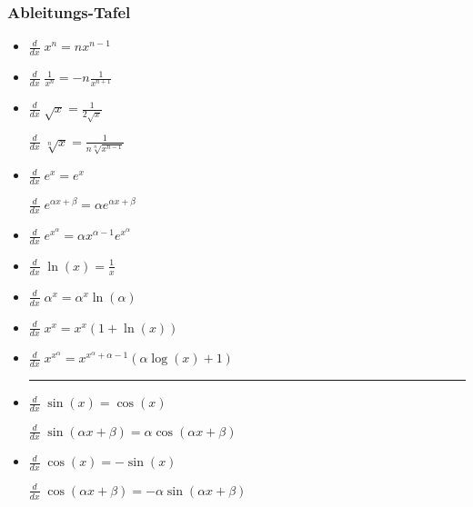 \subsubsection{Ableitungs-Tafel}
\begin{itemize}[leftmargin=*]
	\item $\frac{d}{dx}\; x^n = nx^{n-1}$
	\item $\frac{d}{dx}\; \frac{1}{x^n} = -n \frac{1}{x^{n+1}}$
	
	\item 
	\begin{minipage}{0.4\columnwidth}
		$\frac{d}{dx}\; \sqrt{x} = \frac{1}{2\sqrt{x}}$
	\end{minipage}
	\begin{minipage}{0.55\columnwidth}
		$\frac{d}{dx}\; \sqrt[n]{x} = \frac{1}{n\sqrt[n]{x^{n-1}}}$
	\end{minipage}
	
	\item
	\begin{minipage}{0.4\columnwidth}
		$\frac{d}{dx}\; e^x = e^x$
	\end{minipage}
	\begin{minipage}{0.55\columnwidth}
		$\frac{d}{dx}\; e^{\alpha x + \beta} = \alpha e^{\alpha x + \beta}$
	\end{minipage}
	
	\item $\frac{d}{dx}\; e^{x^\alpha} = \alpha x^{\alpha - 1} e^{x^\alpha}$


	\item $\frac{d}{dx}\; \ln(x) = \frac{1}{x}$
	\item $\frac{d}{dx}\; \alpha^x = \alpha^x \ln(\alpha)$
	\item $\frac{d}{dx}\; x^x = x^x (1 + \ln(x))$
	\item $\frac{d}{dx}\; x^{x^\alpha} = x^{x^\alpha + \alpha - 1} (\alpha \log(x) + 1)$ 
	\vspace{0.1cm}\hrule

	\item 
	\begin{minipage}{0.4\columnwidth}
		$\frac{d}{dx}\; \sin(x) = \cos(x)$	
	\end{minipage}
	\begin{minipage}{0.55\columnwidth}
		$\frac{d}{dx}\; \sin(\alpha x + \beta) = \alpha \cos(\alpha x + \beta)$	
	\end{minipage}
	
	
	\item 
	\begin{minipage}{0.4\columnwidth}
		$\frac{d}{dx}\; \cos(x) = -\sin(x)$
	\end{minipage}
	\begin{minipage}{0.55\columnwidth}
		$\frac{d}{dx}\; \cos(\alpha x + \beta) = -\alpha \sin(\alpha x + \beta)$
	\end{minipage}


\end{itemize}
